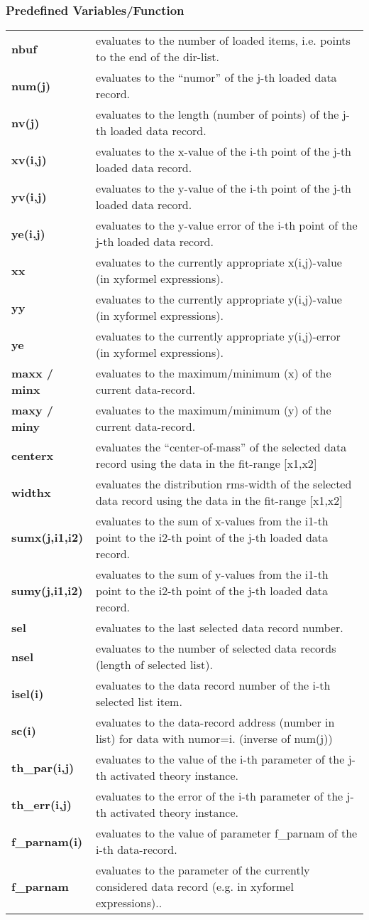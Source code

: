 \documentclass[]{article}
\begin{document}
\hypertarget{predefined-variablesfunction}{%
\subsubsection{Predefined
Variables/Function}\label{predefined-variablesfunction}}

\begin{longtable}[]{@{}ll@{}}
\toprule
\endhead
\textbf{nbuf} & evaluates to the number of loaded items, i.e. points to
the end of the dir-list.\tabularnewline
\textbf{num(j)} & evaluates to the ``numor'' of the j-th loaded data
record.\tabularnewline
\textbf{nv(j)} & evaluates to the length (number of points) of the j-th
loaded data record.\tabularnewline
\textbf{xv(i,j)} & evaluates to the x-value of the i-th point of the
j-th loaded data record.\tabularnewline
\textbf{yv(i,j)} & evaluates to the y-value of the i-th point of the
j-th loaded data record.\tabularnewline
\textbf{ye(i,j)} & evaluates to the y-value error of the i-th point of
the j-th loaded data record.\tabularnewline
\textbf{xx} & evaluates to the currently appropriate x(i,j)-value (in
xyformel expressions).\tabularnewline
\textbf{yy} & evaluates to the currently appropriate y(i,j)-value (in
xyformel expressions).\tabularnewline
\textbf{ye} & evaluates to the currently appropriate y(i,j)-error (in
xyformel expressions).\tabularnewline
\textbf{maxx / minx} & evaluates to the maximum/minimum (x) of the
current data-record.\tabularnewline
\textbf{maxy / miny} & evaluates to the maximum/minimum (y) of the
current data-record.\tabularnewline
\textbf{centerx} & evaluates the ``center-of-mass'' of the selected data
record using the data in the fit-range {[}x1,x2{]}\tabularnewline
\textbf{widthx} & evaluates the distribution rms-width of the selected
data record using the data in the fit-range {[}x1,x2{]}\tabularnewline
\textbf{sumx(j,i1,i2)} & evaluates to the sum of x-values from the i1-th
point to the i2-th point of the j-th loaded data record.\tabularnewline
\textbf{sumy(j,i1,i2)} & evaluates to the sum of y-values from the i1-th
point to the i2-th point of the j-th loaded data record.\tabularnewline
\textbf{sel} & evaluates to the last selected data record
number.\tabularnewline
\textbf{nsel} & evaluates to the number of selected data records (length
of selected list).\tabularnewline
\textbf{isel(i)} & evaluates to the data record number of the i-th
selected list item.\tabularnewline
\textbf{sc(i)} & evaluates to the data-record address (number in list)
for data with numor=i. (inverse of num(j))\tabularnewline
\textbf{th\_par(i,j)} & evaluates to the value of the i-th parameter of
the j-th activated theory instance.\tabularnewline
\textbf{th\_err(i,j)} & evaluates to the error of the i-th parameter of
the j-th activated theory instance.\tabularnewline
\textbf{f\_parnam(i)} & evaluates to the value of parameter f\_parnam of
the i-th data-record.\tabularnewline
\textbf{f\_parnam } & evaluates to the parameter of the currently
considered data record (e.g. in xyformel expressions)..\tabularnewline
\bottomrule
\end{longtable}
\end{document}
